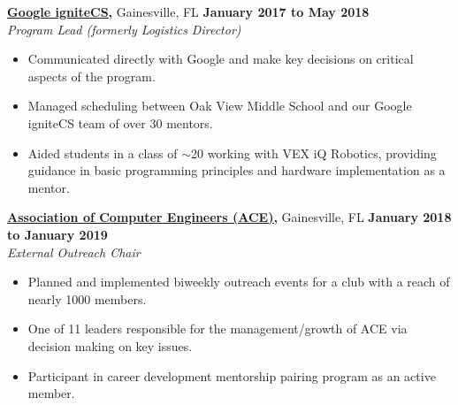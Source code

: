 		\noindent \href{https://sites.google.com/view/ignitecs/home}{\textbf{Google igniteCS,}} Gainesville, FL \hfill\textbf{January 2017 to May 2018}\\
		\textit{Program Lead (formerly Logistics Director)}
		\begin{itemize}[noitemsep,nolistsep, label = {-}]
			\item Communicated directly with Google and make key decisions on critical aspects of the program.
			\item Managed scheduling between Oak View Middle School and our Google igniteCS team of over 30 mentors.
			\item Aided students in a class of $\sim$20 working with VEX iQ Robotics, providing guidance in basic programming principles and hardware implementation as a mentor.
		\end{itemize} 
		\vspace{.20cm}
		
		\noindent \href{https://uf-ace.com/}{\textbf{Association of Computer Engineers (ACE),}} Gainesville, FL \hfill\textbf{January 2018 to January 2019}\\
		\textit{External Outreach Chair}
		\begin{itemize}[noitemsep,nolistsep, label={-}]
			\item Planned and implemented biweekly outreach events for a club with a reach of nearly 1000 members.
			\item One of 11 leaders responsible for the management/growth of ACE via decision making on key issues.
			\item Participant in career development mentorship pairing program as an active member.
		\end{itemize}
		\vspace{.20cm}